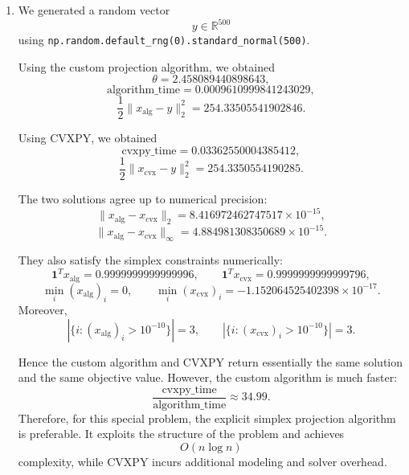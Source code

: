 \documentclass[11pt,letter,notitlepage]{article}
\theoremstyle{definition}
\begin{document}
\begin{solution}
\begin{enumerate}[label=(\alph*)]
\item
We generated a random vector
\[
y\in\mathbb R^{500}
\]
using \texttt{np.random.default\_rng(0).standard\_normal(500)}.

Using the custom projection algorithm, we obtained
\[
\theta = 2.458089440898643,
\]
\[
\text{algorithm\_time} = 0.0009610999841243029,
\]
\[
\frac12\|x_{\mathrm{alg}}-y\|_2^2 = 254.33505541902846.
\]

Using CVXPY, we obtained
\[
\text{cvxpy\_time} = 0.03362550004385412,
\]
\[
\frac12\|x_{\mathrm{cvx}}-y\|_2^2 = 254.3350554190285.
\]

The two solutions agree up to numerical precision:
\[
\|x_{\mathrm{alg}}-x_{\mathrm{cvx}}\|_2
=
8.416972462747517\times 10^{-15},
\]
\[
\|x_{\mathrm{alg}}-x_{\mathrm{cvx}}\|_\infty
=
4.884981308350689\times 10^{-15}.
\]

They also satisfy the simplex constraints numerically:
\[
\mathbf 1^T x_{\mathrm{alg}} = 0.9999999999999996,
\qquad
\mathbf 1^T x_{\mathrm{cvx}} = 0.9999999999999796,
\]
\[
\min_i (x_{\mathrm{alg}})_i = 0,
\qquad
\min_i (x_{\mathrm{cvx}})_i = -1.152064525402398\times 10^{-17}.
\]
Moreover,
\[
|\{i:(x_{\mathrm{alg}})_i>10^{-10}\}|=3,
\qquad
|\{i:(x_{\mathrm{cvx}})_i>10^{-10}\}|=3.
\]

Hence the custom algorithm and CVXPY return essentially the same solution and the same objective value. However, the custom algorithm is much faster:
\[
\frac{\text{cvxpy\_time}}{\text{algorithm\_time}}
\approx 34.99.
\]
Therefore, for this special problem, the explicit simplex projection algorithm is preferable. It exploits the structure of the problem and achieves
\[
O(n\log n)
\]
complexity, while CVXPY incurs additional modeling and solver overhead.

\end{enumerate}

\end{solution}
	
\end{document}
